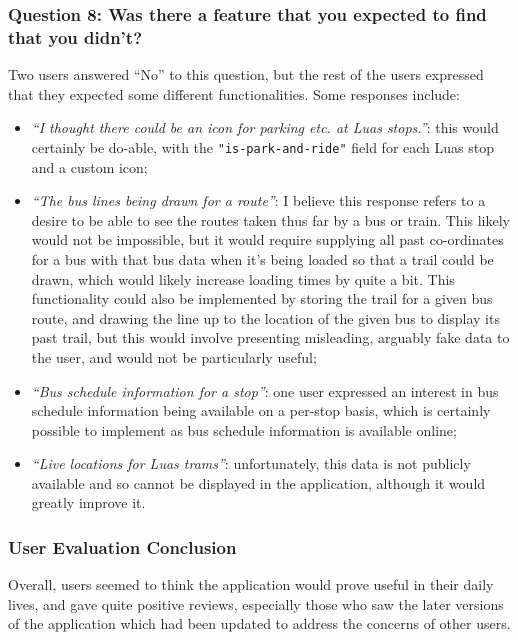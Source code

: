 \documentclass[a4paper,11pt]{report}
\begin{document}
\subsubsection{Question 8: Was there a feature that you expected to find that you didn't?}
Two users answered ``No'' to this question, but the rest of the users expressed that they expected some different functionalities.
Some responses include:
\begin{itemize}
    \item   \textit{``I thought there could be an icon for parking etc. at Luas stops.''}: this would certainly be do-able, with the \texttt{"is-park-and-ride"} field for each Luas stop and a custom icon;
    \item   \textit{``The bus lines being drawn for a route''}: I believe this response refers to a desire to be able to see the routes taken thus far by a bus or train.
            This likely would not be impossible, but it would require supplying all past co-ordinates for a bus with that bus data when it's being loaded so that a trail could be drawn, which would likely increase loading times by quite a bit.
            This functionality could also be implemented by storing the trail for a given bus route, and drawing the line up to the location of the given bus to display its past trail, but this would involve presenting misleading, arguably fake data to the user, and would not be particularly useful;
    \item   \textit{``Bus schedule information for a stop''}: one user expressed an interest in bus schedule information  being available on a per-stop basis, which is certainly possible to implement as bus schedule information is available online;
    \item   \textit{``Live locations for Luas trams''}: unfortunately, this data is not publicly available and so cannot be displayed in the application, although it would greatly improve it.
\end{itemize}

\subsubsection{User Evaluation Conclusion}
Overall, users seemed to think the application would prove useful in their daily lives, and gave quite positive reviews, especially those who saw the later versions of the application which had been updated to address the concerns of other users.
\end{document}
